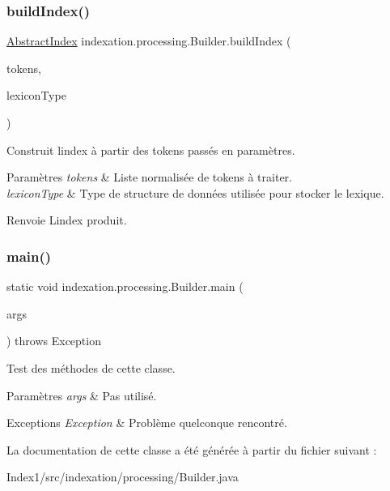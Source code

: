 \subsubsection{\texorpdfstring{build\+Index()}{buildIndex()}}
{\footnotesize\ttfamily \hyperlink{classindexation_1_1AbstractIndex}{Abstract\+Index} indexation.\+processing.\+Builder.\+build\+Index (\begin{DoxyParamCaption}\item[{List$<$ \hyperlink{classindexation_1_1content_1_1Token}{Token} $>$}]{tokens,  }\item[{\hyperlink{enumindexation_1_1AbstractIndex_1_1LexiconType}{Lexicon\+Type}}]{lexicon\+Type }\end{DoxyParamCaption})}

Construit l\textquotesingle{}index à partir des tokens passés en paramètres.


\begin{DoxyParams}{Paramètres}
{\em tokens} & Liste normalisée de tokens à traiter. \\
\hline
{\em lexicon\+Type} & Type de structure de données utilisée pour stocker le lexique. \\
\hline
\end{DoxyParams}
\begin{DoxyReturn}{Renvoie}
L\textquotesingle{}index produit. 
\end{DoxyReturn}
\mbox{\label{classindexation_1_1processing_1_1Builder_aa3f4d7aac345020e466b405676fdfcb9}} 
\subsubsection{\texorpdfstring{main()}{main()}}
{\footnotesize\ttfamily static void indexation.\+processing.\+Builder.\+main (\begin{DoxyParamCaption}\item[{String \mbox{[}$\,$\mbox{]}}]{args }\end{DoxyParamCaption}) throws Exception\hspace{0.3cm}{\ttfamily [static]}}

Test des méthodes de cette classe.


\begin{DoxyParams}{Paramètres}
{\em args} & Pas utilisé.\\
\hline
\end{DoxyParams}

\begin{DoxyExceptions}{Exceptions}
{\em Exception} & Problème quelconque rencontré. \\
\hline
\end{DoxyExceptions}


La documentation de cette classe a été générée à partir du fichier suivant \+:\begin{DoxyCompactItemize}
\item 
Index1/src/indexation/processing/Builder.\+java\end{DoxyCompactItemize}
